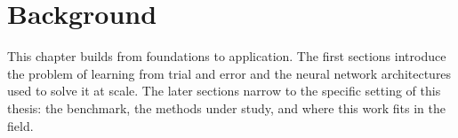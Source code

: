 \chapter{Background}
\label{ch:background}

This chapter builds from foundations to application. The first
sections introduce the problem of learning from trial and error and
the neural network architectures used to solve it at scale. The
later sections narrow to the specific setting of this thesis: the
benchmark, the methods under study, and where this work fits in the
field.












